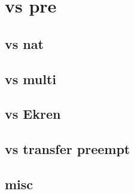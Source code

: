 \section{vs pre}

\subsection{vs nat}


\subsection{vs multi}


\subsection{vs Ekren}


\subsection{vs transfer preempt}


\subsection{misc}

